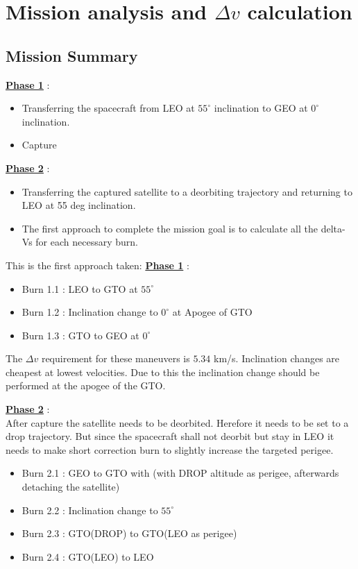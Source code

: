 \chapter{Mission analysis and $\Delta v$ calculation}
\section{Mission Summary}
\textbf{\underline{Phase 1}} :
\begin{itemize}
	\item Transferring the spacecraft from LEO at $55^\circ$ inclination to GEO at $0^\circ$ inclination.
	\item Capture
\end{itemize}

\textbf{\underline{Phase 2}} :
\begin{itemize}
	\item Transferring the captured satellite to a deorbiting trajectory and returning to LEO at 55 deg inclination.
	\item The first approach to complete the mission goal is to calculate all the delta-Vs for each necessary burn.
\end{itemize}

This is the first approach taken:
\textbf{\underline{Phase 1}} :
\begin{itemize}
	\item Burn 1.1 : LEO to GTO at $55^\circ$
	\item Burn 1.2 : Inclination change to $0^\circ$ at Apogee of GTO
	\item Burn 1.3 : GTO to GEO at $0^\circ$
\end{itemize}
The $\Delta v$ requirement for these maneuvers is $5.34$ km/s. Inclination changes are cheapest at lowest
velocities. Due to this the inclination change should be performed at the apogee of the GTO.

\textbf{\underline{Phase 2}} :\\
After capture the satellite needs to be deorbited. Herefore it needs to be set to a drop trajectory. But
since the spacecraft shall not deorbit but stay in LEO it needs to make short correction burn to slightly increase the targeted perigee.
\begin{itemize}
	\item Burn 2.1 : GEO to GTO with (with DROP altitude as perigee, afterwards detaching the satellite)
	\item Burn 2.2 : Inclination change to $55^\circ$
	\item Burn 2.3 : GTO(DROP) to GTO(LEO as perigee)
	\item Burn 2.4 : GTO(LEO) to LEO
\end{itemize}

